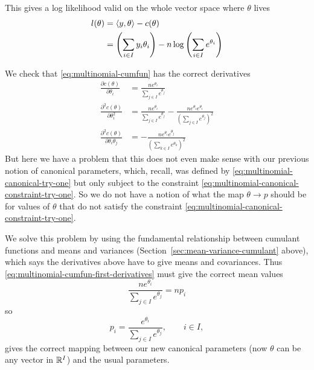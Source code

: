 This gives a log likelihood valid on the whole vector space where
$\theta$ lives
\begin{equation} \label{eq:multinomial-logl}
\begin{split}
   l(\theta) & = \langle y, \theta \rangle - c(\theta)
   \\
   & = \left( \sum_{i \in I} y_i \theta_i \right)
   - n \log \left( \sum_{i \in I} e^{\theta_i} \right)
\end{split}
\end{equation}

We check that \eqref{eq:multinomial-cumfun} has the correct derivatives
\begin{subequations}
\begin{align}
   \frac{\partial c(\theta)}{\partial \theta_i}
   & = 
   \frac{n e^{\theta_i}}{\sum_{j \in I} e^{\theta_j}}
   \label{eq:multinomial-cumfun-first-derivatives}
   \\
   \frac{\partial^2 c(\theta)}{\partial \theta_i^2}
   & = 
   \frac{n e^{\theta_i}}{\sum_{j \in I} e^{\theta_j}}
   -
   \frac{n e^{\theta_i} e^{\theta_i}}
   {\left( \sum_{j \in I} e^{\theta_j} \right)^2}
   \label{eq:multinomial-cumfun-second-derivatives-diagonal}
   \\
   \frac{\partial^2 c(\theta)}{\partial \theta_i \theta_j}
   & = 
   -
   \frac{n e^{\theta_i} e^{\theta_j}}
   {\left( \sum_{k \in I} e^{\theta_k} \right)^2}
   \label{eq:multinomial-cumfun-second-derivatives-off-diagonal}
\end{align}
\end{subequations}
But here we have a problem that this does not even make sense with our
previous notion of canonical parameters, which, recall, was defined
by \eqref{eq:multinomial-canonical-try-one} but only subject to the
constraint \eqref{eq:multinomial-canonical-constraint-try-one}.
So we do not have a notion of what the map $\theta \to p$ should be
for values of $\theta$ that do not satisfy the
constraint \eqref{eq:multinomial-canonical-constraint-try-one}.

We solve this problem by using the fundamental relationship between
cumulant functions and means and variances
(Section~\ref{sec:mean-variance-cumulant} above), which says the
derivatives above have to give means and covariances.
Thus \eqref{eq:multinomial-cumfun-first-derivatives} must
give the correct mean values
$$
   \frac{n e^{\theta_i}}{\sum_{j \in I} e^{\theta_j}} = n p_i
$$
so
\begin{equation} \label{eq:multinomial-canonical-to-usual}
   p_i = \frac{e^{\theta_i}}{\sum_{j \in I} e^{\theta_j}}, \qquad i \in I,
\end{equation}
gives the correct mapping between our new canonical parameters (now
$\theta$ can be any vector in $\mathbb{R}^I$) and the usual parameters.

